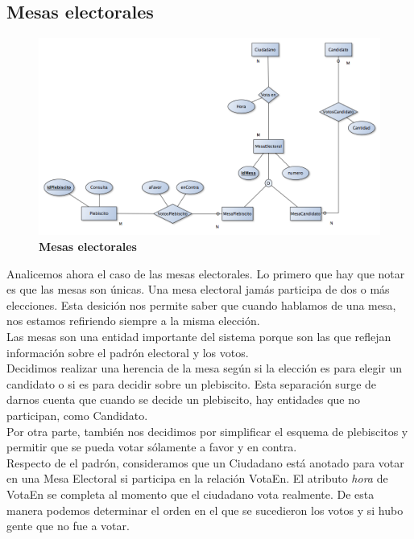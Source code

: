 \subsection{Mesas electorales}
\begin{figure}[H]
   \begin{center}
   \includegraphics[scale=0.5]{graphics/der_mesas.png}
   \caption{\textbf{Mesas electorales}}
   \label{fig:der}
   \end{center}
\end{figure}

Analicemos ahora el caso de las mesas electorales. Lo primero que hay que notar es que las mesas son únicas. Una mesa electoral jamás participa de dos o más elecciones. Esta desición nos permite saber que cuando hablamos de una mesa, nos estamos refiriendo siempre a la misma elección.\\

Las mesas son una entidad importante del sistema porque son las que reflejan información sobre el padrón electoral y los votos.\\

Decidimos realizar una herencia de la mesa según si la elección es para elegir un candidato o si es para decidir sobre un plebiscito. Esta separación surge de darnos cuenta que cuando se decide un plebiscito, hay entidades que no participan, como Candidato.\\

Por otra parte, también nos decidimos por simplificar el esquema de plebiscitos y permitir que se pueda votar sólamente a favor y en contra.\\

Respecto de el padrón, consideramos que un Ciudadano está anotado para votar en una Mesa Electoral si participa en la relación VotaEn. El atributo \textit{hora} de VotaEn se completa al momento que el ciudadano vota realmente. De esta manera podemos determinar el orden en el que se sucedieron los votos y si hubo gente que no fue a votar.\\

